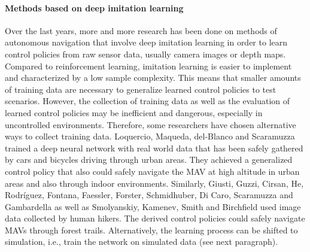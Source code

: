 \paragraph{Methods based on deep imitation learning}





Over the last years, more and more research has been done on methods of autonomous navigation
that involve deep imitation learning in order to learn control policies from raw sensor data, usually camera images or depth maps.  %
Compared to reinforcement learning, imitation learning is easier to implement and characterized by a low sample complexity. 
This means that smaller amounts of training data are necessary to generalize learned control policies to test scenarios.
However, the collection of training data as well as the evaluation of learned control policies
may be inefficient and dangerous, especially in uncontrolled environments.
Therefore, some researchers have chosen alternative ways to collect training data.
Loquercio, Maqueda, del-Blanco and Scaramuzza \cite{Loquercio2018} trained a deep neural network 
with real world data that has been safely gathered by cars and bicycles driving through urban areas.
They achieved a generalized control policy 
that also could safely navigate the MAV at high altitude in urban areas and also through indoor environments.
Similarly, Giusti, Guzzi, Cirsan, He, Rodríguez, Fontana, Faessler, Forster, Schmidhuber, Di Caro, Scaramuzza and Gambardella \cite{Giusti2016}
as well as Smolyanskiy, Kamenev, Smith and Birchfield \cite{Smolyanskiy2017} used image data collected by human hikers.
The derived control policies could safely navigate MAVs through forest trails.
Alternatively, the learning process can be shifted to simulation, i.e., train the network on simulated data (see next paragraph).


